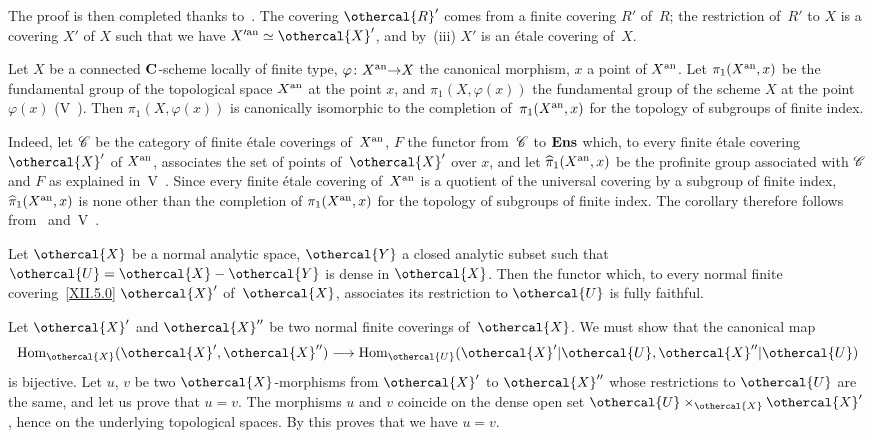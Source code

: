The proof is then completed thanks to~.
The covering $\othercal{R}'$ comes from a finite covering $R'$
of~$R$; the restriction of~$R'$ to $X$ is a covering $X'$ of
$X$ such that we have $X^{\prime\an}\simeq \othercal{X}'$, and
by~(iii) $X'$ is an \'etale covering
of~$X$.

\begin{corollary}
\label{XII.5.2}
Let
$X$ be a connected $\mathbf{C}$-scheme locally of finite type,
$\varphi\colon X^{\an}{\to} X$ the canonical morphism, $x$ a point of
$X^{\mathrm{an}}$. Let $\pi_{1}(X^{\mathrm{an}},x)$ be the fundamental group of
the topological space $X^{\mathrm{an}}$ at the point $x$, and $\pi_{1}(X,\varphi(x))$
the fundamental group of the scheme $X$ at the point $\varphi(x)$
\textup{(V~)}. Then $\pi_{1}(X,\varphi(x))$ is canonically
isomorphic to the completion of~$\pi_{1}(X^{\mathrm{an}},x)$ for the
topology of subgroups of finite index.
\end{corollary}

Indeed, let $\cal{C}$ be the category of finite \'etale
coverings of~$X^{\mathrm{an}}$, $F$ the functor from~$\cal{C}$ to
$\mathbf{Ens}$ which, to every finite \'etale covering $\othercal{X}'$ of
$X^{\mathrm{an}}$, associates the set of points of~$\othercal{X}'$ over
$x$, and let $\widehat{\pi}_{1}(X^{\mathrm{an}},x)$ be the profinite group
associated with $\cal{C}$ and $F$ as explained in~V~.
Since every finite \'etale covering of~$X^{\mathrm{an}}$ is a quotient of the
universal covering by a subgroup of finite index,
$\widehat{\pi}_{1}(X^{\mathrm{an}},x)$ is none other than the completion of
$\pi_{1}(X^{\mathrm{an}},x)$ for the topology of subgroups of finite index.
The corollary therefore follows from~ and~V~.

\begin{proposition}
\label{XII.5.3}
Let $\othercal{X}$ be a normal analytic space, $\othercal{Y}$ a
closed analytic subset such that
$\othercal{U}=\othercal{X}-\othercal{Y}$ is dense in $\othercal{X}$.
Then the functor which, to every normal finite
covering~\eqref{XII.5.0} $\othercal{X}'$ of~$\othercal{X}$, associates its restriction
to $\othercal{U}$ is fully faithful.
\end{proposition}

Let $\othercal{X}'$ and $\othercal{X}''$ be two normal finite coverings
of~$\othercal{X}$. We must show that the canonical map
$$
\Hom_{\othercal{X}}(\othercal{X}',\othercal{X}'') \to
\Hom_{\othercal{U}}(\othercal{X}'|\othercal{U},\othercal{X}''|\othercal{U})
$$
is bijective. Let $u$, $v$ be two $\othercal{X}$-morphisms from
$\othercal{X}'$ to $\othercal{X}''$ whose restrictions to $\othercal{U}$
are the same, and let us prove that $u=v$. The morphisms $u$ and
$v$ coincide on the dense open set
$\othercal{U}\times_{\othercal{X}}\othercal{X}'$, hence on the underlying
topological spaces. By \hbox{\cite[~\S 4~cor]{XII.4}} this
proves that we have $u=v$.

